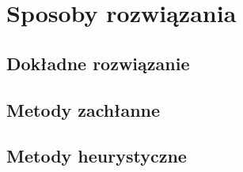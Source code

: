 \chapter{Sposoby rozwiązania}
\thispagestyle{chapterBeginStyle}
\label{rozdzial2}

\section{Dokładne rozwiązanie}

\section{Metody zachłanne}


\section{Metody heurystyczne}


